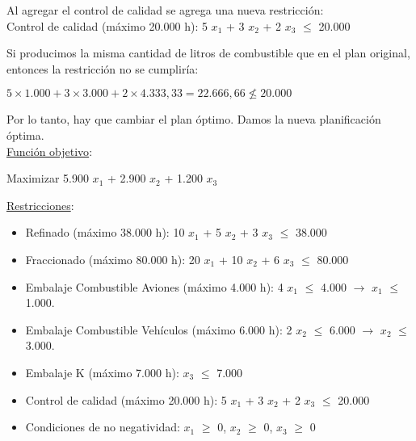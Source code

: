 \documentclass[10pt,a4paper]{article}
\begin{document}
\begin{enumerate}[label=\textbf{\sffamily\large\arabic*.}]
Al agregar el control de calidad se agrega una nueva restricción: \\
Control de calidad (máximo 20.000 h): 5 $x_{1}$ + 3 $x_{2}$ + 2 $x_{3}$ $\leq$ 20.000 \\
\vspace{1em}

Si producimos la misma cantidad de litros de combustible que en el plan original, entonces la restricción no se cumpliría:

$5 \times 1.000 + 3 \times 3.000 + 2 \times 4.333{,}33 = 22.666{,}66 \not\leq 20.000$


\vspace{1em}

Por lo tanto, hay que cambiar el plan óptimo. Damos la nueva planificación óptima. \\

        \underline{Función objetivo}: 

    \begin{center}
        
        Maximizar 5.900 $x_{1}$ + 2.900 $x_{2}$ + 1.200 $x_{3}$

    \end{center}

    \underline{Restricciones}: 

    \begin{itemize}

        \item Refinado (máximo 38.000 h): 10 $x_{1}$ + 5 $x_{2}$ + 3 $x_{3}$ $\leq$ 38.000
        \item Fraccionado (máximo 80.000 h): 20 $x_{1}$ + 10 $x_{2}$ + 6 $x_{3}$ $\leq$ 80.000
        \item Embalaje Combustible Aviones (máximo 4.000 h): 4 $x_{1}$ $\leq$ 4.000 $\rightarrow$ $x_{1}$ $\leq$ 1.000.
        \item Embalaje Combustible Vehículos (máximo 6.000 h): 2 $x_{2}$ $\leq$ 6.000 $\rightarrow$ $x_{2}$ $\leq$ 3.000.
        \item Embalaje K (máximo 7.000 h): $x_{3}$ $\leq$ 7.000
        \item Control de calidad (máximo 20.000 h): 5 $x_{1}$ + 3 $x_{2}$ + 2 $x_{3}$ $\leq$ 20.000
        \item Condiciones de no negatividad: $x_{1}$ $\geq$ 0, $x_{2}$ $\geq$ 0, $x_{3}$ $\geq$ 0\\

    \end{itemize}


\end{enumerate}
\end{document}
